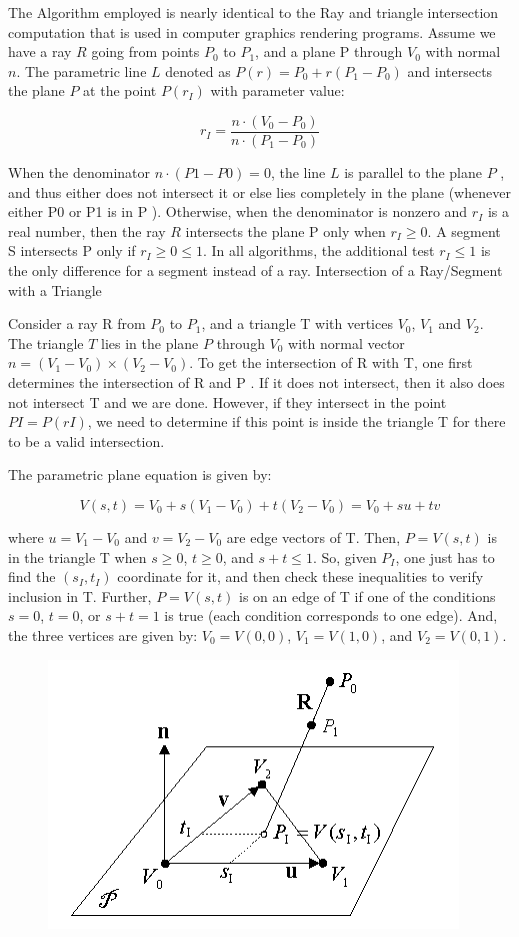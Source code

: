 \documentclass[paper=a4, fontsize=11pt]{scrartcl}
\numberwithin{equation}{section}		%
\numberwithin{figure}{section}			%
\numberwithin{table}{section}				%
\begin{document}
The Algorithm employed is nearly identical to the Ray and triangle intersection computation that is used in computer graphics rendering programs. Assume we have a ray $R$ going from points $P_0$ to $P_1$, and a plane P through $V_0$ with normal $n$. The parametric line $L$ denoted as $P(r)=P_0+r(P_1-P_0)$ and intersects the plane $P$ at the point $P(r_I)$ with parameter value:


\begin{equation}
\label{rI}
r_I=\frac{n\cdot(V_0-P_0)}{n\cdot(P_1-P_0)}
\end{equation}

When the denominator $n\cdot(P1-P0)=0$, the line $L$ is parallel to the plane $P$ , and thus either does not intersect it or else lies completely in the plane (whenever either P0 or P1 is in P ). Otherwise, when the denominator is nonzero and $r_I$ is a real number, then the ray $R$ intersects the plane P only when $r_I\geq0$. A segment S intersects P only if $r_I\geq0\leq1$. In all algorithms, the additional test $r_I\leq1$ is the only difference for a segment instead of a ray.
Intersection of a Ray/Segment with a Triangle

Consider a ray R from $P_0$ to $P_1$, and a triangle T with vertices $V_0$, $V_1$ and $V_2$. The triangle $T$ lies in the plane $P$  through $V_0$ with normal vector $n=(V_1-V_0)\times(V_2-V_0)$. To get the intersection of R with T, one first determines the intersection of R and P . If it does not intersect, then it also does not intersect T and we are done. However, if they intersect in the point $PI = P(rI)$, we need to determine if this point is inside the triangle T for there to be a valid intersection.

 The parametric plane equation is given by:
 
 \begin{equation}
\label{vsl}
V(s,t) = V_0+s(V_1-V_0)+t(V_2-V_0) = V_0+su+tv
\end{equation}

where $u=V_1-V_0$ and $v=V_2-V_0$ are edge vectors of T. Then, $P=V(s,t)$ is in the triangle T when $s\geq0$, $t\geq0$, and $s+t\leq1$. So, given $P_I$, one just has to find the $(s_I, t_I)$ coordinate for it, and then check these inequalities to verify inclusion in T. Further, $P=V(s,t)$ is on an edge of T if one of the conditions $s = 0$, $t = 0$, or $s + t = 1$ is true (each condition corresponds to one edge). And, the three vertices are given by: $V_0=V(0,0)$, $V_1=V(1,0)$, and $V_2=V(0,1)$.

\begin{figure}[h!]
\centering
\includegraphics[width=0.5 
\linewidth]{alg.png}
\label{alg}
\end{figure}
\end{document}
